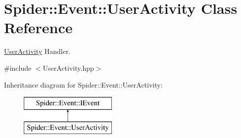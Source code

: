 \hypertarget{class_spider_1_1_event_1_1_user_activity}{}\section{Spider\+:\+:Event\+:\+:User\+Activity Class Reference}
\label{class_spider_1_1_event_1_1_user_activity}


\hyperlink{class_spider_1_1_event_1_1_user_activity}{User\+Activity} Handler.  




{\ttfamily \#include $<$User\+Activity.\+hpp$>$}

Inheritance diagram for Spider\+:\+:Event\+:\+:User\+Activity\+:\begin{figure}[H]
\begin{center}
\leavevmode
\includegraphics[height=2.000000cm]{class_spider_1_1_event_1_1_user_activity}
\end{center}
\end{figure}
